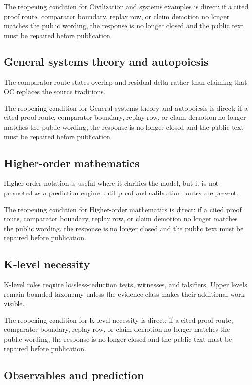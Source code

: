 The reopening condition for Civilization and systems examples is direct: if a cited proof route, comparator boundary, replay row, or claim demotion no longer matches the public wording, the response is no longer closed and the public text must be repaired before publication.


\subsection{General systems theory and autopoiesis}

The comparator route states overlap and residual delta rather than claiming that OC replaces the source traditions.


The reopening condition for General systems theory and autopoiesis is direct: if a cited proof route, comparator boundary, replay row, or claim demotion no longer matches the public wording, the response is no longer closed and the public text must be repaired before publication.


\subsection{Higher-order mathematics}

Higher-order notation is useful where it clarifies the model, but it is not promoted as a prediction engine until proof and calibration routes are present.


The reopening condition for Higher-order mathematics is direct: if a cited proof route, comparator boundary, replay row, or claim demotion no longer matches the public wording, the response is no longer closed and the public text must be repaired before publication.


\subsection{K-level necessity}

K-level roles require lossless-reduction tests, witnesses, and falsifiers. Upper levels remain bounded taxonomy unless the evidence class makes their additional work visible.


The reopening condition for K-level necessity is direct: if a cited proof route, comparator boundary, replay row, or claim demotion no longer matches the public wording, the response is no longer closed and the public text must be repaired before publication.


\subsection{Observables and prediction}


